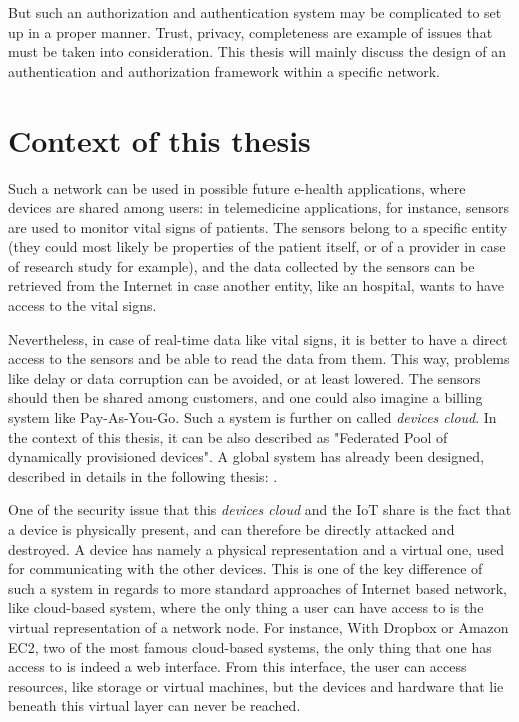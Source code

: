 But such an authorization and authentication system may be complicated to set up in a proper manner. Trust, privacy, completeness are example of issues that must be taken into consideration. This thesis will mainly discuss the design of an authentication and authorization framework within a specific network. 

\section{Context of this thesis}

Such a network can be used in possible future e-health applications, where devices are shared among users: in telemedicine applications, for instance, sensors are used to monitor vital signs of patients. The sensors belong to a specific entity (they could most likely be properties of the patient itself, or of a provider in case of research study for example), and the data collected by the sensors can be retrieved from the Internet in case another entity, like an hospital, wants to have access to the vital signs. 

Nevertheless, in case of real-time data like vital signs, it is better to have a direct access to the sensors and be able to read the data from them. This way, problems like delay or data corruption can be avoided, or at least lowered. The sensors should then be shared among customers, and one could also imagine a billing system like Pay-As-You-Go. Such a system is further on called \emph{devices cloud}. In the context of this thesis, it can be also described as "Federated Pool of dynamically provisioned devices". A global system has already been designed, described in details in the following thesis:  \cite{reference_thesis}.

One of the security issue that this \emph{devices cloud} and the IoT share is the fact that a device is physically present, and can therefore be directly attacked and destroyed. A device has namely a physical representation and a virtual one, used for communicating with the other devices. This is one of the key difference of such a system in regards to more standard approaches of Internet based network, like cloud-based system, where the only thing a user can have access to is the virtual representation of a network node. For instance, With Dropbox or Amazon EC2, two of the most famous cloud-based systems, the only thing that one has access to is indeed a web interface. From this interface, the user can access resources, like storage or virtual machines, but the devices and hardware that lie beneath this virtual layer can never be reached.

